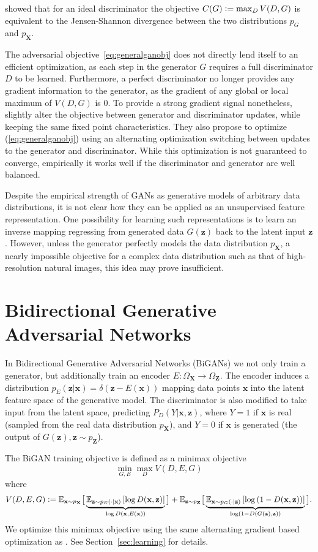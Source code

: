 \documentclass{article}
\newcommand{\expect}[2]{\mathbb{E}_{#1}\left[#2\right]}
\newcommand{\logp}[1]{\log\left(#1\right)}
\newcommand{\defeq}{\vcentcolon=}
\renewcommand{\vec}[1]{\mathbf{#1}}
\newcommand{\x}{\vec{x}}
\newcommand{\X}{\vec{X}}
\newcommand{\OX}{\Omega_\X}
\newcommand{\z}{\vec{z}}
\newcommand{\Z}{\vec{Z}}
\newcommand{\OZ}{\Omega_\Z}
\newcommand{\refsec}[1]{Section~\ref{sec:#1}}
\newcommand{\lblsec}[1]{\label{sec:#1}}
\begin{document}
\citet{gan} showed that for an ideal discriminator the objective $C(G) \defeq \max_D V(D, G)$ is equivalent to the Jensen-Shannon divergence between the two distributions $p_G$ and $p_\X$.

The adversarial objective~\ref{eq:generalganobj} does not directly lend itself to an efficient optimization, as each step in the generator $G$ requires a full discriminator $D$ to be learned.
Furthermore, a perfect discriminator no longer provides any gradient information to the generator, as the gradient of any global or local maximum of $V(D, G)$ is $0$.
To provide a strong gradient signal nonetheless, \citet{gan} slightly alter the objective between generator and discriminator updates, while keeping the same fixed point characteristics.
They also propose to optimize (\ref{eq:generalganobj}) using an alternating optimization switching between updates to the generator and discriminator.
While this optimization is not guaranteed to converge, empirically it works well if the discriminator and generator are well balanced.

Despite the empirical strength of GANs as generative models of arbitrary data distributions,
it is not clear how they can be applied as an unsupervised feature representation.
One possibility for learning such representations is to learn an inverse mapping regressing from generated data $G(\z)$ back to the latent input $\z$.
However, unless the generator perfectly models the data distribution $p_\X$,
a nearly impossible objective for a complex data distribution such as that of high-resolution natural images,
this idea may prove insufficient.

\section{Bidirectional Generative Adversarial Networks}
\lblsec{bigan}
In Bidirectional Generative Adversarial Networks (BiGANs) we not only train a generator, but additionally train an encoder $E:\OX \to \OZ$.
The encoder induces a distribution $p_E(\z | \x) = \delta(\z - E(\x))$ mapping data points $\x$ into the latent feature space of the generative model.
The discriminator is also modified to take input from the latent space, predicting $P_D(Y | \x, \z)$,
where $Y=1$ if $\x$ is real (sampled from the real data distribution $p_\X$),
and $Y=0$ if $\x$ is generated (the output of $G(\z), \z \sim p_\Z$).

The BiGAN training objective is defined as a minimax objective
\begin{equation}
\min\limits_{G, E}
\max\limits_D
V(D, E, G)
\end{equation}
where
\begin{align}
V(D, E, G)
\defeq
\mathbb{E}_{\x \sim p_\X}\big[
  \underbrace{
    \expect{\z \sim p_E(\cdot | \x)}{
      \log D(\x, \z)
    }
  }_{
    \log D(\x, E(\x))
  }
\big]
+
\mathbb{E}_{\z \sim p_\Z}\big[
  \underbrace{
    \expect{\x \sim p_G(\cdot | \z)}{
      \logp{1 - D(\x, \z)}
    }
  }_{
    \logp{1 - D(G(\z), \z)}
  }
\big].
\label{eq:vdge}
\end{align}
We optimize this minimax objective using the same alternating gradient based optimization as \citet{gan}.
See \refsec{learning} for details.
\end{document}

